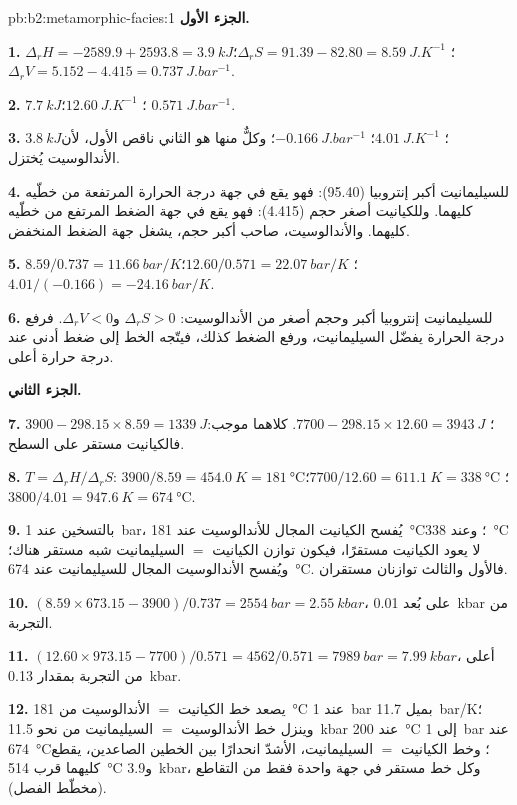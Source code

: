 \begin{solution}{pb:b2:metamorphic-facies:1}
\noindent\textbf{الجزء الأول.}

\textbf{1.} $\Delta_r H = -2589.9 + 2593.8 = \qty{3.9}{kJ}$؛ $\Delta_r S = 91.39 - 82.80 =
\qty{8.59}{J.K^{-1}}$؛ $\Delta_r V = 5.152 - 4.415 = \qty{0.737}{J.bar^{-1}}$.

\textbf{2.} $\qty{7.7}{kJ}$؛ $\qty{12.60}{J.K^{-1}}$؛ $\qty{0.571}{J.bar^{-1}}$.

\textbf{3.} $\qty{3.8}{kJ}$؛ $\qty{4.01}{J.K^{-1}}$؛ $\qty{-0.166}{J.bar^{-1}}$؛ وكلٌّ منها
هو الثاني ناقص الأول، لأن الأندالوسيت يُختزل.

\textbf{4.} للسيليمانيت أكبر إنتروبيا (95.40): فهو يقع في جهة درجة الحرارة المرتفعة
من خطّيه كليهما. وللكيانيت أصغر حجم (4.415): فهو يقع في جهة
الضغط المرتفع من خطّيه كليهما. والأندالوسيت، صاحب أكبر حجم، يشغل
جهة الضغط المنخفض.

\textbf{5.} $8.59/0.737 = \qty{11.66}{bar/K}$؛ $12.60/0.571 = \qty{22.07}{bar/K}$؛
$4.01/(-0.166) = \qty{-24.16}{bar/K}$.

\textbf{6.} للسيليمانيت إنتروبيا أكبر وحجم أصغر من الأندالوسيت: $\Delta_r S > 0$
و$\Delta_r V < 0$. فرفع درجة الحرارة يفضّل السيليمانيت، ورفع الضغط
كذلك، فيتّجه الخط إلى ضغط أدنى عند درجة حرارة أعلى.

\noindent\textbf{الجزء الثاني.}

\textbf{7.} $3900 - 298.15\times8.59 = \qty{+1339}{J}$؛ $7700 - 298.15\times12.60 =
\qty{+3943}{J}$. كلاهما موجب: فالكيانيت مستقر على السطح.

\textbf{8.} $T = \Delta_r H/\Delta_r S$: $3900/8.59 = \qty{454.0}{K} = \qty{181}{\celsius}$؛
$7700/12.60 = \qty{611.1}{K} = \qty{338}{\celsius}$؛ $3800/4.01 = \qty{947.6}{K} =
\qty{674}{\celsius}$.

\textbf{9.} بالتسخين عند \qty{1}{bar}، يُفسح الكيانيت المجال للأندالوسيت عند
\qty{181}{\celsius}؛ وعند \qty{338}{\celsius} لا يعود الكيانيت مستقرًا، فيكون توازن الكيانيت $=$
السيليمانيت شبه مستقر هناك؛ ويُفسح الأندالوسيت المجال للسيليمانيت عند
\qty{674}{\celsius}. فالأول والثالث توازنان مستقران.

\textbf{10.} $(8.59\times673.15 - 3900)/0.737 = \qty{2554}{bar} = \qty{2.55}{kbar}$،
على بُعد \qty{0.01}{kbar} من التجربة.

\textbf{11.} $(12.60\times973.15 - 7700)/0.571 = 4562/0.571 = \qty{7989}{bar} =
\qty{7.99}{kbar}$، أعلى من التجربة بمقدار \qty{0.13}{kbar}.

\textbf{12.} يصعد خط الكيانيت $=$ الأندالوسيت من \qty{181}{\celsius} عند \qty{1}{bar} بميل
\qty{11.7}{bar/K}؛ وينزل خط الأندالوسيت $=$ السيليمانيت من نحو \qty{11.5}{kbar} عند
\qty{200}{\celsius} إلى \qty{1}{bar} عند \qty{674}{\celsius}؛ وخط الكيانيت $=$ السيليمانيت،
الأشدّ انحدارًا بين الخطين الصاعدين، يقطع كليهما قرب \qty{514}{\celsius} و\qty{3.9}{kbar}، وكل خط مستقر في
جهة واحدة فقط من التقاطع (مخطّط الفصل).


\end{solution}
